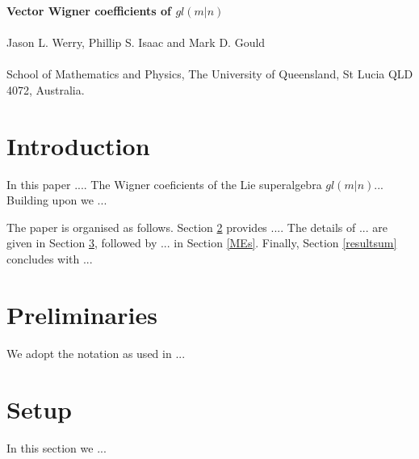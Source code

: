 \documentclass[12pt]{article}
\begin{document}
\begin{center}
{\large\bf Vector Wigner coefficients of $gl(m|n)$}\\
~~\\

{\large Jason L. Werry, Phillip S. Isaac and Mark D. Gould}\\
~~\\

School of Mathematics and Physics, The University of Queensland, St Lucia QLD 4072, Australia.
\end{center}

\begin{abstract}
Wigner Coefficients are ...
\end{abstract}

% 

\section{Introduction}
 
In this paper ....  The Wigner coeficients of the Lie superalgebra $gl(m|n)$...  Building upon \cite{GIW2} we ...

The paper is organised as follows. Section \ref{prelim} provides .... The details of ...
are given in Section \ref{branch}, followed by ... in Section \ref{MEs}. Finally, Section \ref{resultsum} concludes with ...  


\section{Preliminaries}
\label{prelim}

We adopt the notation as used in \cite{GIW1,GIW2} ...



\section{Setup} 
\label{branch}
In this section we ...
\end{document}
